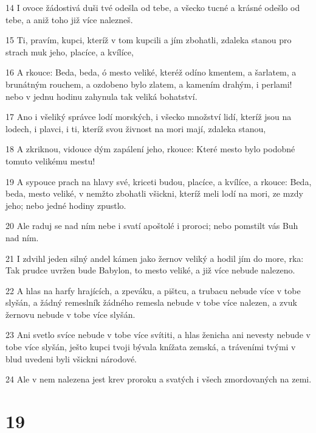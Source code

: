 \par 14 I ovoce žádostivá duši tvé odešla od tebe, a všecko tucné a krásné odešlo od tebe, a aniž toho již více nalezneš.
\par 15 Ti, pravím, kupci, kteríž v tom kupcili a jím zbohatli, zdaleka stanou pro strach muk jeho, placíce, a kvílíce,
\par 16 A rkouce: Beda, beda, ó mesto veliké, kteréž odíno kmentem, a šarlatem, a brunátným rouchem, a ozdobeno bylo zlatem, a kamením drahým, i perlami! nebo v jednu hodinu zahynula tak veliká bohatství.
\par 17 Ano i všeliký správce lodí morských, i všecko množství lidí, kteríž jsou na lodech, i plavci, i ti, kteríž svou živnost na mori mají, zdaleka stanou,
\par 18 A zkriknou, vidouce dým zapálení jeho, rkouce: Které mesto bylo podobné tomuto velikému mestu!
\par 19 A sypouce prach na hlavy své, kriceti budou, placíce, a kvílíce, a rkouce: Beda, beda, mesto veliké, v nemžto zbohatli všickni, kteríž meli lodí na mori, ze mzdy jeho; nebo jedné hodiny zpustlo.
\par 20 Ale raduj se nad ním nebe i svatí apoštolé i proroci; nebo pomstilt vás Buh nad ním.
\par 21 I zdvihl jeden silný andel kámen jako žernov veliký a hodil jím do more, rka: Tak prudce uvržen bude Babylon, to mesto veliké, a již více nebude nalezeno.
\par 22 A hlas na harfy hrajících, a zpeváku, a pištcu, a trubacu nebude více v tobe slyšán, a žádný remeslník žádného remesla nebude v tobe více nalezen, a zvuk žernovu nebude v tobe více slyšán.
\par 23 Ani svetlo svíce nebude v tobe více svítiti, a hlas ženicha ani nevesty nebude v tobe více slyšán, ješto kupci tvoji bývala knížata zemská, a tráveními tvými v blud uvedeni byli všickni národové.
\par 24 Ale v nem nalezena jest krev proroku a svatých i všech zmordovaných na zemi.

\chapter{19}

